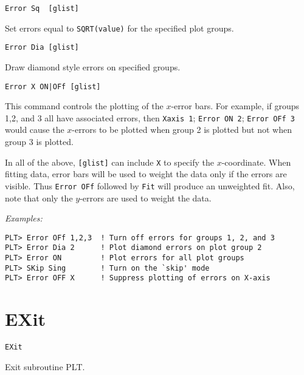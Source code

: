 \medskip
\begin{verbatim}
Error Sq  [glist]
\end{verbatim}
   Set errors equal to {\tt SQRT(value)} for the specified plot groups.

\medskip
\begin{verbatim}
Error Dia [glist]
\end{verbatim}
   Draw diamond style errors on specified groups.

\medskip
\begin{verbatim}
Error X ON|OFf [glist]
\end{verbatim}
   This command controls the plotting of the $x$-error bars.  For example,
if groups 1,2, and 3 all have associated errors, then {\tt Xaxis 1}; {\tt Error ON 2};
{\tt Error OFf 3} would cause the $x$-errors to be plotted when group 2 is plotted
but not when group 3 is plotted.

In all of the above, {\tt [glist]} can include {\tt X} to specify
the $x$-coordinate.  When fitting data, error bars will be used to
weight the data only if the errors are visible.  Thus {\tt Error~OFf}
followed by {\tt Fit} will produce an unweighted fit.  Also, note
that only the $y$-errors are used to weight the data.

\medskip\noindent
{\em Examples:}
\begin{verbatim}
PLT> Error OFf 1,2,3  ! Turn off errors for groups 1, 2, and 3
PLT> Error Dia 2      ! Plot diamond errors on plot group 2
PLT> Error ON         ! Plot errors for all plot groups
PLT> SKip Sing        ! Turn on the `skip' mode
PLT> Error OFF X      ! Suppress plotting of errors on X-axis
\end{verbatim}

\section*{EXit}
\begin{verbatim}
EXit
\end{verbatim}
   Exit subroutine PLT.

